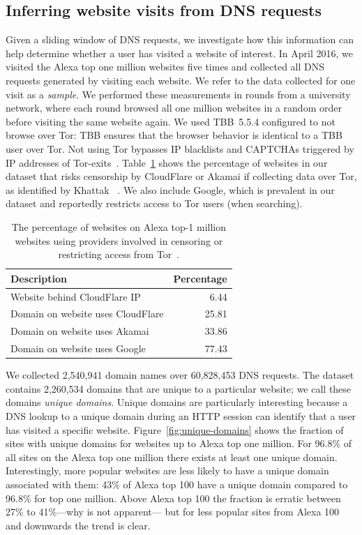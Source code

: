 \subsection{Inferring website visits from DNS requests}
\label{sec:dns2site}

Given a sliding window of DNS requests, we investigate
how this information can help determine whether a user has visited a website of interest.
In April 2016, we visited the Alexa top one million websites five times
and collected all DNS requests generated by visiting each
website. We refer to the data collected for one visit as a \emph{sample}.
We performed these measurements in rounds from a university network, where
each round browsed all one million websites in a random order before visiting
the same website again. We used TBB~5.5.4
configured to {not browse over Tor}: TBB ensures that the browser behavior
is identical to a TBB user over Tor. Not using Tor bypasses
IP blacklists and CAPTCHAs triggered by IP addresses of
Tor-exits~\cite{Khattak2016a}.
Table~\ref{tab:dns-censor} shows the percentage of websites in our dataset that
risks censorship by CloudFlare or Akamai if collecting data over Tor, as
identified by Khattak \ea~\cite{Khattak2016a}. We also include Google,
which is prevalent in our dataset and
reportedly restricts access to Tor users (when searching).

\begin{table}[t]
	\centering
	\begin{tabular}{l r}
	\toprule
	\textbf{Description} & \textbf{Percentage} \\
	\midrule
	Website behind CloudFlare IP & 6.44 \\
	Domain on website uses CloudFlare & 25.81 \\
	Domain on website uses Akamai & 33.86 \\
	Domain on website uses Google & 77.43 \\
	\bottomrule
	\end{tabular}
	\caption{The percentage of websites on Alexa top-1 million websites using providers
	involved in censoring or restricting access from Tor~\cite{Khattak2016a}.}
	\label{tab:dns-censor}
\end{table}

We collected 2,540,941 domain names over 60,828,453 DNS
requests. The dataset contains 2,260,534 domains that are unique to
a particular website; we call these domains {\em unique
  domains}. Unique domains are particularly interesting because a DNS
lookup to a unique domain during an HTTP session can identify that a
user has visited a specific website. Figure~\ref{fig:unique-domains} shows the
fraction of
sites with unique domains for websites up to Alexa top one million.
For 96.8\% of all sites on the Alexa top one million
there exists at least one unique domain.
Interestingly, more
popular websites are less likely to have a unique domain associated with
them: 43\% of Alexa top 100 have a unique domain compared to 96.8\% for
top one million. Above Alexa top 100 the fraction is erratic between
27\% to 41\%---why is not apparent---
but for less popular sites from Alexa 100 and downwards the trend is clear.

